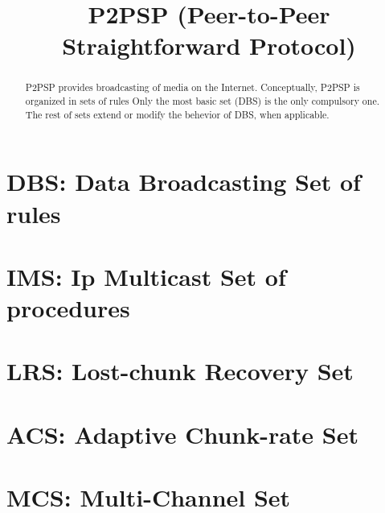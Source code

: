 \title{P2PSP (Peer-to-Peer Straightforward Protocol)}
\maketitle
\tableofcontents

\begin{abstract}
P2PSP provides broadcasting of media on the Internet.  Conceptually,
P2PSP is organized in sets of rules Only the most basic set (DBS) is
the only compulsory one. The rest of sets extend or modify the
behevior of DBS, when applicable.
\end{abstract}

\section{DBS: Data Broadcasting Set of rules}
\label{sec:DBL}


\section{IMS: Ip Multicast Set of procedures}
\label{sec:IMS}


\section{LRS: Lost-chunk Recovery Set}
\label{sec:LRS}


\section{ACS: Adaptive Chunk-rate Set}
\label{sec:ACS}


\section{MCS: Multi-Channel Set}
\label{sec:MCS}



